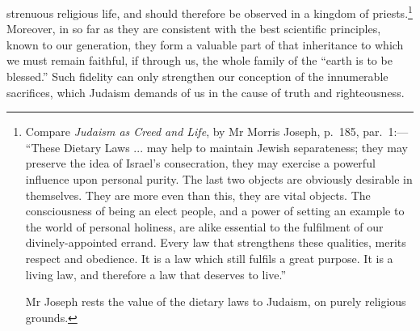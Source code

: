 strenuous religious life, and should therefore be
observed in a kingdom of priests.\footnote{Compare
\textsl{Judaism as Creed and Life}, by Mr Morris
Joseph, p.\ 185, par.\ 1:— “These Dietary Laws ... may
help to maintain Jewish separateness; they may preserve
the idea of Israel’s consecration, they may exercise a powerful
influence upon personal purity. The last two objects are
obviously desirable in themselves. They are more even
than this, they are vital objects. The consciousness of
being an elect people, and a power of setting an example to
the world of personal holiness, are alike essential to the
fulfilment of our divinely-appointed errand. Every law that
strengthens these qualities, merits respect and obedience. It
is a law which still fulfils a great purpose. It is a living
law, and therefore a law that deserves to live.”

Mr Joseph rests the value of the dietary laws to Judaism,
on purely religious grounds.}
Moreover, in so far as they are consistent with the best
scientific principles, known to our generation,
they form a valuable part of that inheritance
to which we must remain faithful, if through
us, the whole family of the “earth is to be
blessed.” Such fidelity can only strengthen
our conception of the innumerable sacrifices,
which Judaism demands of us in the cause
of truth and righteousness.

